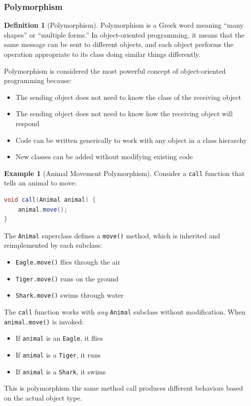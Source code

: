 \documentclass[11pt, a4paper, notitlepage]{report}
\theoremstyle{definition}
\newtheorem{definition}[theorem]{Definition}
\theoremstyle{remark}
\theoremstyle{definition}
\newtheorem{example}[theorem]{Example}
\begin{document}
\subsubsection{Polymorphism}

\begin{definition}[Polymorphism]
\label{def:ch1-polymorphism}
Polymorphism is a Greek word meaning ``many shapes'' or ``multiple forms.'' In object-oriented programming, it means that the same message can be sent to different objects, and each object performs the operation appropriate to its class  doing similar things differently.
\end{definition}

\begin{keyresult}[title={Power of Polymorphism}]
Polymorphism is considered the most powerful concept of object-oriented programming because:
\begin{itemize}
  \item The sending object does not need to know the class of the receiving object
  \item The sending object does not need to know how the receiving object will respond
  \item Code can be written generically to work with any object in a class hierarchy
  \item New classes can be added without modifying existing code
\end{itemize}
\end{keyresult}

\begin{example}[Animal Movement Polymorphism]
\label{ex:ch1-polymorphism-animals}
Consider a \texttt{call} function that tells an animal to move:

\begin{lstlisting}[language=Java]
void call(Animal animal) {
    animal.move();
}
\end{lstlisting}

The \texttt{Animal} superclass defines a \texttt{move()} method, which is inherited and reimplemented by each subclass:
\begin{itemize}
  \item \texttt{Eagle.move()}  flies through the air
  \item \texttt{Tiger.move()}  runs on the ground
  \item \texttt{Shark.move()}  swims through water
\end{itemize}

The \texttt{call} function works with \emph{any} \texttt{Animal} subclass without modification. When \texttt{animal.move()} is invoked:
\begin{itemize}
  \item If \texttt{animal} is an \texttt{Eagle}, it flies
  \item If \texttt{animal} is a \texttt{Tiger}, it runs
  \item If \texttt{animal} is a \texttt{Shark}, it swims
\end{itemize}

This is polymorphism  the same method call produces different behaviors based on the actual object type.
\end{example}
\end{document}
